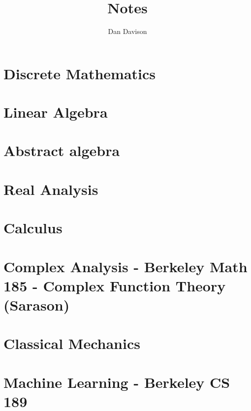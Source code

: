 \documentclass{book}
\title{Notes}
\author{Dan Davison}
\begin{document}
\frontmatter
\maketitle
\tableofcontents
\mainmatter

\chapter{Discrete Mathematics}


\chapter{Linear Algebra}


\chapter{Abstract algebra}


\chapter{Real Analysis}


\chapter{Calculus}



\chapter{Complex Analysis - Berkeley Math 185 - Complex Function Theory (Sarason)}


\chapter{Classical Mechanics}


\chapter{Machine Learning - Berkeley CS 189}


\end{document}
